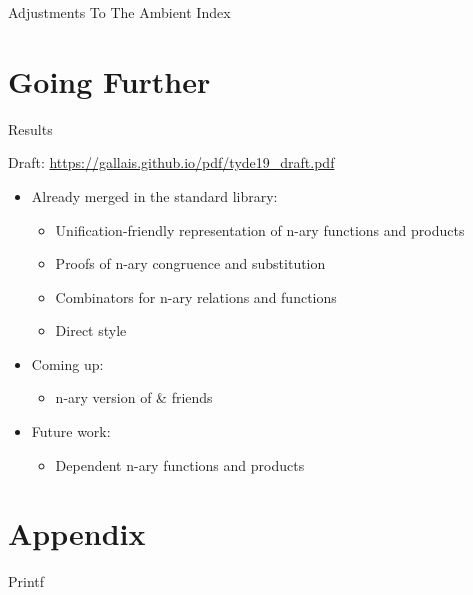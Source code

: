 \documentclass[compress,9pt]{beamer}
\begin{document}
\begin{frame}{Adjustments To The Ambient Index}
\end{frame}


\section{Going Further}

\begin{frame}{Results}

  Draft: {\large\url{https://gallais.github.io/pdf/tyde19_draft.pdf}}
  \bigskip

  \begin{itemize}
    \item Already merged in the standard library:
    \begin{itemize}
      \item Unification-friendly representation of n-ary functions and products
      \item Proofs of n-ary congruence and substitution
      \item Combinators for n-ary relations and functions
      \item Direct style 
    \end{itemize}
    \bigskip
    \item Coming up:
    \begin{itemize}
      \item n-ary version of  \& friends
    \end{itemize}
    \bigskip
    \item Future work:
    \begin{itemize}
      \item Dependent n-ary functions and products
    \end{itemize}
  \end{itemize}
\end{frame}

\section*{Appendix}

\begin{frame}{Printf}
  \small
  \begin{minipage}[t]{0.5\textwidth}
  \end{minipage}\begin{minipage}[t]{0.4\textwidth}
  \end{minipage}

  \normalsize
\end{frame}
\end{document}
